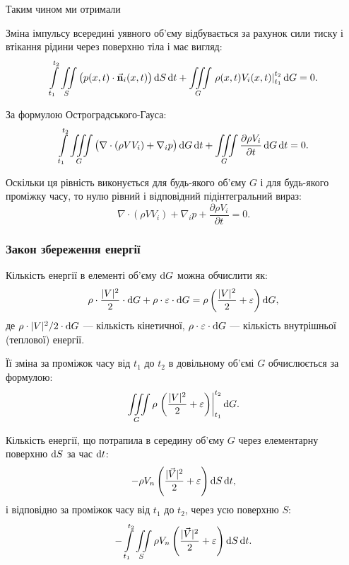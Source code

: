 Таким чином ми отримали
\begin{law}
	Зміна імпульсу всередині уявного об'єму відбувається за рахунок сили тиску і втікання рідини через поверхню тіла і має вигляд:
	\begin{equation}
		\displaystyle\int\limits_{t_1}^{t_2} \displaystyle\iint\limits_S \big( p(x, t) \cdot \vec{\textbf{n}}_i(x, t) \big) \mathop{}\!\mathrm{d} S \mathop{}\!\mathrm{d} t
		+ \displaystyle\iiint\limits_G \left. \rho(x, t) V_i(x, t) \right|_{t_1}^{t_2} \mathop{}\!\mathrm{d} G = 0.
	\end{equation}
\end{law}

За формулою Остроградського-Гауса:
\begin{equation}
	\displaystyle\int\limits_{t_1}^{t_2} \displaystyle\iiint\limits_G \big( \nabla \cdot (\rho V V_i) + \nabla_i p \big) \mathop{}\!\mathrm{d} G \mathop{}\!\mathrm{d} t + \displaystyle\iiint\limits_G \frac{\partial \rho V_i}{\partial t}\mathop{}\!\mathrm{d} G \mathop{}\!\mathrm{d} t = 0.
\end{equation}

Оскільки ця рівність виконується для будь-якого об'єму $G$ і для будь-якого проміжку часу, то нулю рівний і відповідний підінтегральний вираз:
\begin{equation}
	\nabla \cdot (\rho V V_i) + \nabla_i p + \frac{\partial \rho V_i}{\partial t} = 0.
\end{equation}

\subsubsection{Закон збереження енергії}

Кількість енергії в елементі об'єму $\mathop{}\!\mathrm{d} G$ можна обчислити як:
\begin{equation}
	\rho \cdot \frac{|V|^2}{2} \cdot \mathop{}\!\mathrm{d} G + \rho \cdot \varepsilon \cdot \mathop{}\!\mathrm{d} G = \rho \left( \frac{|V|^2}{2} + \varepsilon \right) \mathop{}\!\mathrm{d} G,
\end{equation}
де $\rho \cdot |V|^2 / 2 \cdot \mathop{}\!\mathrm{d} G$ --- кількість кінетичної, $\rho \cdot \varepsilon \cdot \mathop{}\!\mathrm{d} G$ --- кількість внутрішньої (теплової) енергії. \medskip

Її зміна за проміжок часу від $t_1$ до $t_2$ в довільному об'ємі $G$ обчислюється за формулою:
\begin{equation}
	\displaystyle\iiint\limits_G \rho \left. \left( \frac{|V|^2}{2} + \varepsilon \right) \right|_{t_1}^{t_2} \mathop{}\!\mathrm{d} G.
\end{equation}

Кількість енергії, що потрапила в середину об'єму $G$ через елементарну поверхню $\mathop{}\!\mathrm{d} S$ за час $\mathop{}\!\mathrm{d} t$:
\begin{equation}
	- \rho V_n \left( \frac{|\vec V|^2}{2} + \varepsilon \right) \mathop{}\!\mathrm{d} S \mathop{}\!\mathrm{d} t,
\end{equation}
і відповідно за проміжок часу від $t_1$ до $t_2$, через усю поверхню $S$:
\begin{equation}
	- \displaystyle\int\limits_{t_1}^{t_2} \displaystyle\iint\limits_S \rho V_n \left( \frac{|\vec V|^2}{2} + \varepsilon \right) \mathop{}\!\mathrm{d} S \mathop{}\!\mathrm{d} t.
\end{equation}

